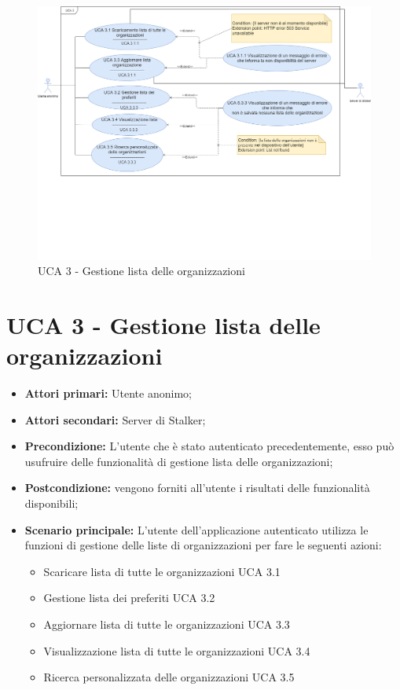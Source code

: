 \newpage
\begin{figure}[h]
	\centering
	\caption{UCA 3 - Gestione lista delle organizzazioni}
	\includegraphics[scale=0.33]{sezioni/UseCase/Immagini/UCA3.png}
\end{figure}
\section{UCA 3 - Gestione lista delle organizzazioni}%
\begin{itemize}
\item \textbf{Attori primari:} Utente anonimo;
\item \textbf{Attori secondari:} Server di Stalker;
\item \textbf{Precondizione:} L’utente che è stato autenticato precedentemente, esso può usufruire delle funzionalità di gestione lista delle organizzazioni;
\item \textbf{Postcondizione:} vengono forniti all’utente i risultati delle funzionalità disponibili;
\item \textbf{Scenario principale:} L’utente dell’applicazione autenticato utilizza le funzioni di gestione delle liste di organizzazioni per fare le seguenti azioni:
	\begin{itemize}
		\item Scaricare lista di tutte le organizzazioni UCA 3.1
		\item Gestione lista dei preferiti UCA 3.2
		\item Aggiornare lista di tutte le organizzazioni UCA 3.3
		\item Visualizzazione lista di tutte le organizzazioni UCA 3.4
		\item Ricerca personalizzata delle organizzazioni UCA 3.5
	\end{itemize}
\end{itemize}

